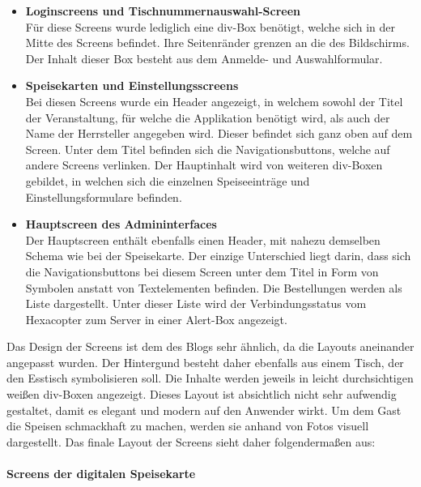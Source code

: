 \begin{itemize}
    \item \textbf{Loginscreens und Tischnummernauswahl-Screen}\\  
Für diese Screens wurde lediglich eine div-Box benötigt, welche sich in der Mitte des Screens befindet. Ihre Seitenränder grenzen an die des Bildschirms. Der Inhalt dieser Box besteht aus dem Anmelde- und Auswahlformular.
	\item \textbf{Speisekarten und Einstellungsscreens}\\
Bei diesen Screens wurde ein Header angezeigt, in welchem sowohl der Titel der Veranstaltung, für welche die Applikation benötigt wird, als auch der Name der Herrsteller angegeben wird. Dieser befindet sich ganz oben auf dem Screen. Unter dem Titel befinden sich die Navigationsbuttons, welche auf andere Screens verlinken. Der Hauptinhalt wird von weiteren div-Boxen gebildet, in welchen sich die einzelnen Speiseeinträge und Einstellungsformulare befinden. 
    \item \textbf{Hauptscreen des Admininterfaces}\\ 
Der Hauptscreen enthält ebenfalls einen Header, mit nahezu demselben Schema wie bei der Speisekarte. Der einzige Unterschied liegt darin, dass sich die Navigationsbuttons bei diesem Screen unter dem Titel in Form von Symbolen anstatt von Textelementen befinden. Die Bestellungen werden als Liste dargestellt. Unter dieser Liste wird der Verbindungsstatus vom Hexacopter zum Server in einer Alert-Box angezeigt.
  \end{itemize}
Das Design der Screens ist dem des Blogs sehr ähnlich, da die Layouts aneinander angepasst wurden. Der Hintergund besteht daher ebenfalls aus einem Tisch, der den Esstisch symbolisieren soll. Die Inhalte werden jeweils in leicht durchsichtigen weißen div-Boxen angezeigt. Dieses Layout ist absichtlich nicht sehr aufwendig gestaltet, damit es elegant und modern auf den Anwender wirkt.
Um dem Gast die Speisen schmackhaft zu machen, werden sie anhand von Fotos visuell dargestellt.
Das finale Layout der Screens sieht daher folgendermaßen aus:\\ 
\\ 
\textbf{Screens der digitalen Speisekarte}
